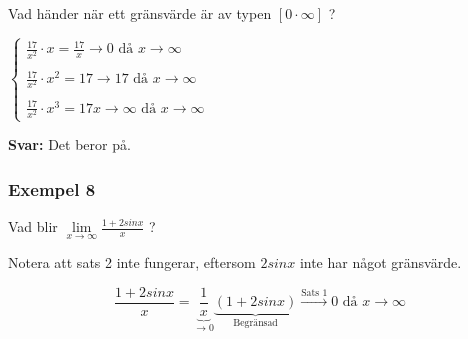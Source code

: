 \documentclass[swedish]{article}
\begin{document}
Vad händer när ett gränsvärde är av typen $\left[ 0 \cdot \infty \right]$ ?

\bigbreak

$\left\{ \begin{array}{l}
    \frac{17}{x^2} \cdot x = \frac{17}{x} \to 0 \text{ då } x \to \infty\\
    \\
    \frac{17}{x^2} \cdot x^2 = 17 \to 17 \text{ då } x \to \infty\\ 
    \\
    \frac{17}{x^2} \cdot x^3 = 17x \to \infty \text{ då } x \to \infty
\end{array} \right.$

\bigbreak

\textbf{Svar: } Det beror på.

\subsubsection{Exempel 8}

Vad blir $\lim\limits_{x \to \infty} \frac{1 + 2sinx}{x}$ ?

\bigbreak

Notera att sats 2 inte fungerar, eftersom $2sinx$ inte har något gränsvärde. 

$$\frac{1+2sinx}{x} = \underbrace{\frac{1}{x}}_{\to 0} \underbrace{(1+2sinx)}_{\text{Begränsad}} \xrightarrow{\text{Sats 1}} 0 \text{ då } x \to \infty$$
\end{document}
